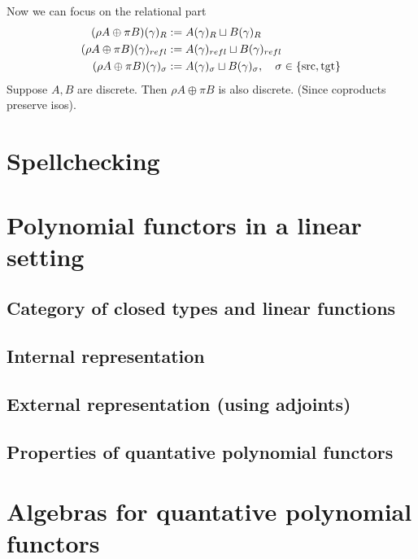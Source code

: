 \documentclass[12pt,a4paper]{article}
\begin{document}
Now we can focus on the relational part 
\begin{align*}
  (\rho A \oplus \pi B)(\gamma)_R &:= A(\gamma)_R \sqcup B(\gamma)_R\\
  (\rho A \oplus \pi B)(\gamma)_{refl} &:= A(\gamma)_{refl} \sqcup B(\gamma)_{refl}\\
  (\rho A \oplus \pi B)(\gamma)_{\sigma} &:= A(\gamma)_{\sigma} \sqcup B(\gamma)_{\sigma}, \quad \sigma \in \{\text{src}, \text{tgt}\}
\end{align*}
Suppose $A,B$ are discrete. Then $\rho A \oplus \pi B$ is also discrete.
(Since coproducts preserve isos).

\section{Spellchecking}
\section{Polynomial functors in a linear setting}
\subsection{Category of closed types and linear functions} 
\subsection{Internal representation}
\subsection{External representation (using adjoints)}
\subsection{Properties of quantative polynomial functors}

\section{Algebras for quantative polynomial functors}
\end{document}
